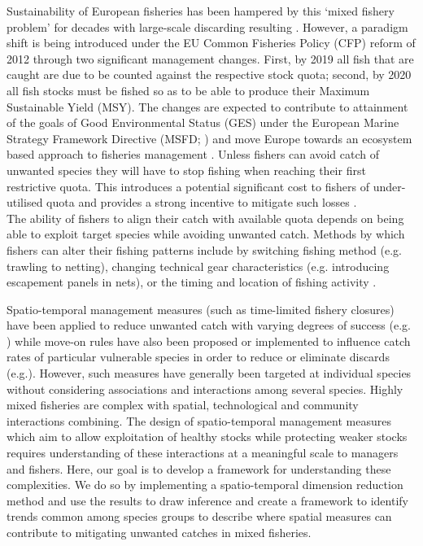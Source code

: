 \documentclass{nature}
\begin{document}
\begin{linenumbers}
Sustainability of European fisheries has been hampered by this `mixed
fishery problem' for decades with large-scale discarding resulting \cite{Borges2015,
Uhlmann2014}.  However, a paradigm shift is being introduced under the
EU Common Fisheries Policy (CFP) reform of 2012 through two significant
management changes.  First, by 2019 all fish that are caught are due to be
counted against the respective stock quota; second, by 2020 all fish stocks
must be fished so as to be able to produce their Maximum Sustainable Yield
(MSY)\cite{EuropeanParliamentandCounciloftheEuropeanUnion2013}. The changes are
expected to contribute to attainment of the goals of Good Environmental Status (GES) under
the European Marine Strategy Framework Directive (MSFD;
\cite{EuropeanParliament2008}) and move Europe towards an ecosystem based
approach to fisheries management \cite{Garcia2003}. Unless fishers can avoid
catch of unwanted species they will have to stop fishing when reaching their
first restrictive quota. This introduces a potential significant cost to
fishers of under-utilised quota\cite{Hoff2010a, Ulrich2016} and provides a
strong incentive to mitigate such losses \cite{Condie2013, Condie2013a}. \\

The ability of fishers to align their catch with available quota depends on
being able to exploit target species while avoiding unwanted catch. Methods by
which fishers can alter their fishing patterns include by switching fishing
method (e.g. trawling to netting), changing technical gear characteristics
(e.g.  introducing escapement panels in nets), or the timing and location of
fishing activity \cite{Fulton2011b, vanPutten2012a}.

Spatio-temporal management measures (such as time-limited fishery closures)
have been applied to reduce unwanted catch with varying degrees of
success (e.g.  \cite{Needle2011, Holmes2011, Beare2010, Dinmore2003}) while
move-on rules have also been proposed or implemented to influence catch rates
of particular vulnerable species in order to reduce or eliminate discards
(e.g.\cite{Gardner2008, Dunn2011, Dunn2014a}). However, such measures have
generally been targeted at individual species without considering associations
and interactions among several species. Highly mixed fisheries are complex with
spatial, technological and community interactions combining. The design of
spatio-temporal management measures which aim to allow exploitation of healthy
stocks while protecting weaker stocks requires understanding of these
interactions at a meaningful scale to managers and fishers. Here, our goal is to develop a
framework for understanding these complexities. We do so by implementing a
spatio-temporal dimension reduction method and use the results to draw
inference and create a framework to identify trends common among species groups
to describe where spatial measures can contribute to mitigating unwanted
catches in mixed fisheries.


\end{linenumbers}
\end{document}

